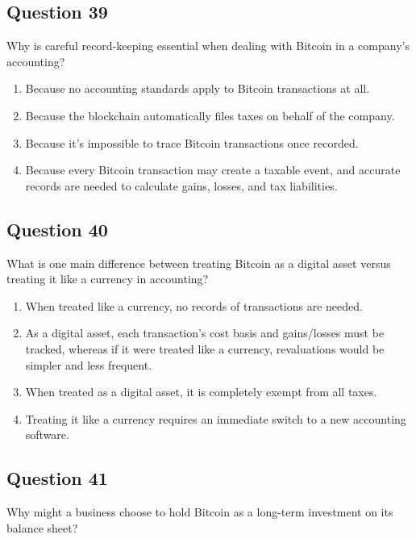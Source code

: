 \documentclass[12pt,a4paper]{article}
\begin{document}
\bigskip


\subsection*{Question 39}
Why is careful record-keeping essential when dealing with Bitcoin in a company’s accounting?

\begin{enumerate}[label=\Alph*., leftmargin=*]
\item Because no accounting standards apply to Bitcoin transactions at all.
\item Because the blockchain automatically files taxes on behalf of the company.
\item Because it’s impossible to trace Bitcoin transactions once recorded.
\item Because every Bitcoin transaction may create a taxable event, and accurate records are needed to calculate gains, losses, and tax liabilities.
\end{enumerate}

\bigskip


\subsection*{Question 40}
What is one main difference between treating Bitcoin as a digital asset versus treating it like a currency in accounting?

\begin{enumerate}[label=\Alph*., leftmargin=*]
\item When treated like a currency, no records of transactions are needed.
\item As a digital asset, each transaction’s cost basis and gains/losses must be tracked, whereas if it were treated like a currency, revaluations would be simpler and less frequent.
\item When treated as a digital asset, it is completely exempt from all taxes.
\item Treating it like a currency requires an immediate switch to a new accounting software.
\end{enumerate}

\bigskip


\subsection*{Question 41}
Why might a business choose to hold Bitcoin as a long-term investment on its balance sheet?
\end{document}
